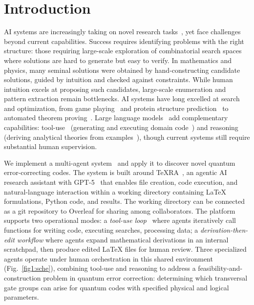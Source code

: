 \documentclass[pdflatex,sn-nature]{sn-jnl}%
\theoremstyle{thmstyleone}%
\theoremstyle{thmstyletwo}%
\theoremstyle{thmstylethree}%
\begin{document}
\maketitle

\section{Introduction}
\label{sec:intro}

AI systems are increasingly taking on novel research tasks~\cite{Wang2023Scientific,Lu2024AI,Binz2025How,Glazer2024FrontierMath,Lu2025Can}, yet face challenges beyond current capabilities. Success requires identifying problems with the right structure: those requiring large-scale exploration of combinatorial search spaces where solutions are hard to generate but easy to verify. In mathematics and physics, many seminal solutions were obtained by hand-constructing candidate solutions, guided by intuition and checked against constraints. While human intuition excels at proposing such candidates, large-scale enumeration and pattern extraction remain bottlenecks. AI systems have long excelled at search and optimization, from game playing~\cite{Silver2016Mastering,Silver2017Mastering} and protein structure prediction~\cite{Jumper2021Highly} to automated theorem proving~\cite{Romera-Paredes2024Mathematical,Trinh2024Solving}. Large language models~\cite{Brown2020Language} add complementary capabilities: tool-use~\cite{Schick2023Toolformer,Anthropic2024Model,Patil2023Gorilla} (generating and executing domain code~\cite{Tian2024SciCode,Jimenez2024SWEbench}) and reasoning (deriving analytical theories from examples~\cite{OpenAI2024OpenAI,Guo2025DeepSeekR1}), though current systems still require substantial human supervision.

We implement a multi-agent system~\cite{Wu2023AutoGen,Du2023Improving,Sumers2023Cognitive} and apply it to discover novel quantum error-correcting codes. The system is built around TeXRA~\cite{Texra2025TeXRA}, an agentic AI research assistant with GPT-5~\cite{Openai2025GPT} that enables file creation, code execution, and natural-language interaction within a working directory containing \LaTeX{} formulations, Python code, and results. The working directory can be connected as a git repository to Overleaf for sharing among collaborators. The platform supports two operational modes: a \emph{tool-use loop}~\cite{Yao2023ReAct} where agents iteratively call functions for writing code, executing searches, processing data; a \emph{derivation-then-edit workflow} where agents expand mathematical derivations in an internal scratchpad, then produce edited LaTeX files for human review. Three specialized agents operate under human orchestration in this shared environment (Fig.~\ref{fig1:sche}), combining tool-use and reasoning to address a feasibility-and-construction problem in quantum error correction: determining which transversal gate groups can arise for quantum codes with specified physical and logical parameters.
\end{document}
